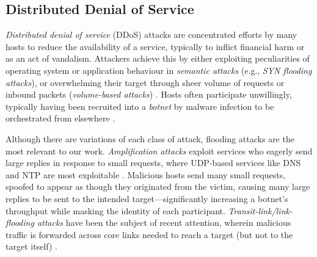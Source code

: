
\subsection{Distributed Denial of Service}


\emph{Distributed denial of service} (DDoS) attacks are concentrated efforts by many hosts to reduce the availability of a service, typically to inflict financial harm or as an act of vandalism.
Attackers achieve this by either exploiting peculiarities of operating system or application behaviour in \emph{semantic attacks} (e.g., \emph{SYN flooding attacks}), or overwhelming their target through sheer volume of requests or inbound packets (\emph{volume-based attacks}) \cite{DBLP:conf/imc/JonkerKKRSD17}.
Hosts often participate unwillingly, typically having been recruited into a \emph{botnet} by malware infection to be orchestrated from elsewhere \cite{DBLP:conf/uss/AntonakakisABBB17}.

Although there are variations of each class of attack, flooding attacks are the most relevant to our work.
\emph{Amplification attacks} exploit services who eagerly send large replies in response to small requests, where UDP-based services like DNS and NTP are most exploitable \cite{DBLP:conf/ndss/Rossow14, DBLP:conf/uss/KuhrerHRH14}.
Malicious hosts send many small requests, spoofed to appear as though they originated from the victim, causing many large replies to be sent to the intended target---significantly increasing a botnet's throughput while masking the identity of each participant.
\emph{Transit-link/link-flooding attacks} have been the subject of recent attention, wherein malicious traffic is forwarded across core links needed to reach a target (but not to the target itself) \cite{DBLP:conf/sp/KangLG13, DBLP:conf/esorics/StuderP09}.

